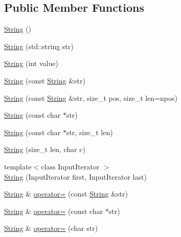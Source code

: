 \subsection*{Public Member Functions}
\begin{DoxyCompactItemize}
\item 
\mbox{\hyperlink{class_rad_j_a_v_1_1_string_a985090598133e2119dce64b79b176250}{String}} ()
\item 
\mbox{\hyperlink{class_rad_j_a_v_1_1_string_ab80c5e67a1b9c5bd24e75abfa0c8c77e}{String}} (std\+::string str)
\item 
\mbox{\hyperlink{class_rad_j_a_v_1_1_string_ac73be9671464715f5f461b242896ee0e}{String}} (int value)
\item 
\mbox{\hyperlink{class_rad_j_a_v_1_1_string_abdf12af39be1b08362731678b1edbf9c}{String}} (const \mbox{\hyperlink{class_rad_j_a_v_1_1_string}{String}} \&str)
\item 
\mbox{\hyperlink{class_rad_j_a_v_1_1_string_ab223546fa6dfdb4d6d5b80e846ab9642}{String}} (const \mbox{\hyperlink{class_rad_j_a_v_1_1_string}{String}} \&str, size\+\_\+t pos, size\+\_\+t len=npos)
\item 
\mbox{\hyperlink{class_rad_j_a_v_1_1_string_a56172a9c1c2e45232ed90cb4e79a9875}{String}} (const char $\ast$str)
\item 
\mbox{\hyperlink{class_rad_j_a_v_1_1_string_a71f9c004439cc655fe780c437d45c3d3}{String}} (const char $\ast$str, size\+\_\+t len)
\item 
\mbox{\hyperlink{class_rad_j_a_v_1_1_string_a37ca615c93d4853a3f6840fc3e29624e}{String}} (size\+\_\+t len, char c)
\item 
{\footnotesize template$<$class Input\+Iterator $>$ }\\\mbox{\hyperlink{class_rad_j_a_v_1_1_string_a028d4f2e378a4e60468e974cc7c1e81d}{String}} (Input\+Iterator first, Input\+Iterator last)
\item 
\mbox{\hyperlink{class_rad_j_a_v_1_1_string}{String}} \& \mbox{\hyperlink{class_rad_j_a_v_1_1_string_aeea818d89b0993b64719638e4cc5566d}{operator=}} (const \mbox{\hyperlink{class_rad_j_a_v_1_1_string}{String}} \&str)
\item 
\mbox{\hyperlink{class_rad_j_a_v_1_1_string}{String}} \& \mbox{\hyperlink{class_rad_j_a_v_1_1_string_a6fbb39ef74564d3d89725289bb8b0b85}{operator=}} (const char $\ast$str)
\item 
\mbox{\hyperlink{class_rad_j_a_v_1_1_string}{String}} \& \mbox{\hyperlink{class_rad_j_a_v_1_1_string_a4de813eeaf030288539bd39df05090ea}{operator=}} (char str)

\end{DoxyCompactItemize}
